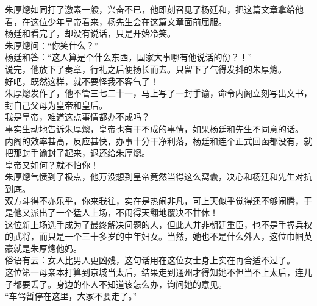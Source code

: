 \begin{multicols}{\theparacolNo}
朱厚熜如同打了激素一般，兴奋不已，他即刻召见了杨廷和，把这篇文章拿给他看，在这位少年皇帝看来，杨先生会在这篇文章面前屈服。\\

杨廷和看完了，却没有说话，只是开始冷笑。\\

朱厚熜问：“你笑什么？”\\

杨廷和答：“这人算是个什么东西，国家大事哪有他说话的份？！”\\

说完，他放下了奏章，行礼之后便扬长而去。只留下了气得发抖的朱厚熜。\\

好吧，既然这样，就不要怪我不客气了！\\

朱厚熜发作了，他不管三七二十一，马上写了一封手谕，命令内阁立刻写出文书，封自己父母为皇帝和皇后。\\

我是皇帝，难道这点事情都办不成吗？\\

事实生动地告诉朱厚熜，皇帝也有干不成的事情，如果杨廷和先生不同意的话。\\

内阁的效率甚高，反应甚快，办事十分干净利落，杨廷和连个正式回函都没有，就把那封手谕封了起来，退还给朱厚熜。\\

皇帝又如何？就不怕你！\\

朱厚熜气愤到了极点，他万没想到皇帝竟然当得这么窝囊，决心和杨廷和先生对抗到底。\\

双方斗得不亦乐乎，你来我往，实在是热闹非凡，可上天似乎觉得还不够闹腾，于是他又派出了一个猛人上场，不闹得天翻地覆决不甘休！\\

这位新上场选手成为了最终解决问题的人，但此人并非朝廷重臣，也不是手握兵权的武将，而只是一个三十多岁的中年妇女。当然，她也不是什么外人，这位巾帼英豪就是朱厚熜他妈。\\

俗语有云：女人比男人更凶残，这句话用在这位女士身上实在再合适不过了。\\

这位第一母亲本打算到京城当太后，结果走到通州才得知她不但当不上太后，连儿子都要丢了。身边的仆人不知道该怎么办，询问她的意见。\\

“车驾暂停在这里，大家不要走了。”\\


\end{multicols}
